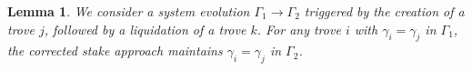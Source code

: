 \documentclass[reqno]{article}
\newtheorem{lemma}[theorem]{Lemma}
\begin{document}



\begin{lemma}\label{result:1} We consider a system evolution $\Gamma_1 \rightarrow \Gamma_2$ triggered by the creation of a trove $j$, followed by a liquidation of a trove $k$. For any trove $i$ with $\gamma_i = \gamma_j$ in $\Gamma_1$, the corrected stake approach maintains $\gamma_i = \gamma_j$ in $\Gamma_2$.
\end{lemma}
\end{document}

